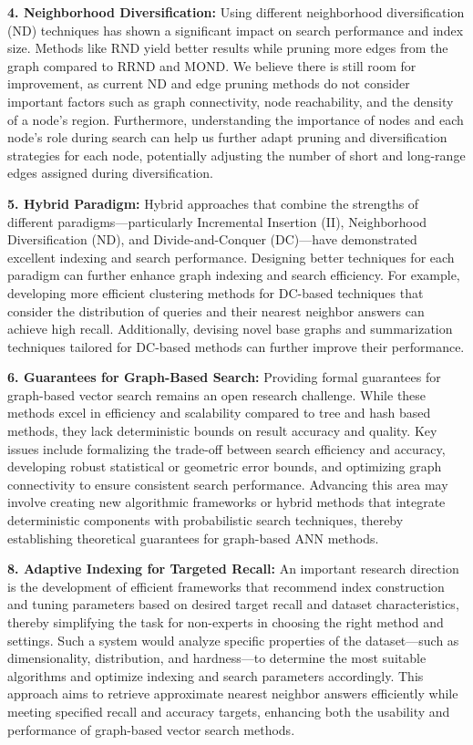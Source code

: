 \textbf{4. Neighborhood Diversification:} Using different neighborhood diversification (ND) techniques has shown a significant impact on search performance and index size. Methods like RND yield better results while pruning more edges from the graph compared to RRND and MOND. We believe there is still room for improvement, as current ND and edge pruning methods do not consider important factors such as graph connectivity, node reachability, and the density of a node's region. Furthermore, understanding the importance of nodes and each node's role during search can help us further adapt pruning and diversification strategies for each node, potentially adjusting the number of short and long-range edges assigned during diversification.


\textbf{5. Hybrid Paradigm:} Hybrid approaches that combine the strengths of different paradigms—particularly Incremental Insertion (II), Neighborhood Diversification (ND), and Divide-and-Conquer (DC)—have demonstrated excellent indexing and search performance. Designing better techniques for each paradigm can further enhance graph indexing and search efficiency. For example, developing more efficient clustering methods for DC-based techniques that consider the distribution of queries and their nearest neighbor answers can achieve high recall. Additionally, devising novel base graphs and summarization techniques tailored for DC-based methods can further improve their performance.


\textbf{6. Guarantees for Graph-Based Search:} Providing formal guarantees for graph-based vector search remains an open research challenge. While these methods excel in efficiency and scalability compared to tree and hash based methods, they lack deterministic bounds on result accuracy and quality. Key issues include formalizing the trade-off between search efficiency and accuracy, developing robust statistical or geometric error bounds, and optimizing graph connectivity to ensure consistent search performance. Advancing this area may involve creating new algorithmic frameworks or hybrid methods that integrate deterministic components with probabilistic search techniques, thereby establishing theoretical guarantees for graph-based ANN methods.


\textbf{8. Adaptive Indexing for Targeted Recall:}
An important research direction is the development of efficient frameworks that recommend index construction and tuning parameters based on desired target recall and dataset characteristics, thereby simplifying the task for non-experts in choosing the right method and settings. Such a system would analyze specific properties of the dataset—such as dimensionality, distribution, and hardness—to determine the most suitable algorithms and optimize indexing and search parameters accordingly. This approach aims to retrieve approximate nearest neighbor answers efficiently while meeting specified recall and accuracy targets, enhancing both the usability and performance of graph-based vector search methods.


